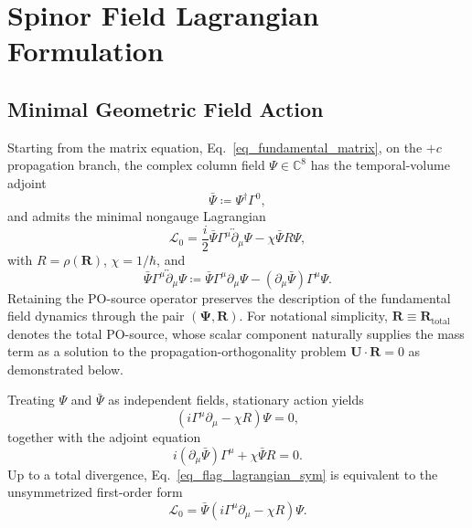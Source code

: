 
\section{Spinor Field Lagrangian Formulation}\label{appx_spinor_lagrangian}
\subsection{Minimal Geometric Field Action}
Starting from the matrix equation, Eq.~\eqref{eq_fundamental_matrix}, on the $+c$ propagation branch, the complex column field $\Psi\in\mathbb{C}^{8}$ has the temporal-volume adjoint
\begin{equation}
    \bar{\Psi} \coloneqq \Psi^{\dagger}\Gamma^{0},
\end{equation}
and admits the minimal nongauge Lagrangian
\begin{equation}\label{eq_flag_lagrangian_sym}
    \mathcal{L}_{0} = \frac{i}{2}\bar{\Psi}\Gamma^{\mu}\overleftrightarrow{\partial}_{\mu}\Psi - \chi\bar{\Psi}R\Psi,
\end{equation}
with $R = \rho(\mathbf{R})$, $\chi = 1/\hbar$, and
\begin{equation}
    \bar{\Psi}\Gamma^{\mu}\overleftrightarrow{\partial}_{\mu}\Psi \coloneqq \bar{\Psi}\Gamma^{\mu}\partial_{\mu}\Psi - (\partial_{\mu}\bar{\Psi})\Gamma^{\mu}\Psi.
\end{equation}
Retaining the PO-source operator preserves the description of the fundamental field dynamics through the pair $(\boldsymbol{\Psi},\mathbf{R})$. For notational simplicity, $\mathbf{R}\equiv\mathbf{R}_{\mathrm{total}}$ denotes the total PO-source, whose scalar component naturally supplies the mass term as a solution to the propagation-orthogonality problem $\mathbf{U}\cdot\mathbf{R}=0$ as demonstrated below.

Treating $\Psi$ and $\bar{\Psi}$ as independent fields, stationary action yields
\begin{equation}\label{eq_flag_euler_lagrange}
    \left(i\Gamma^{\mu}\partial_{\mu} - \chi R\right)\Psi = 0,
\end{equation}
together with the adjoint equation
\begin{equation}\label{eq_flag_adjoint_euler_lagrange}
    i(\partial_{\mu}\bar{\Psi})\Gamma^{\mu} + \chi\bar{\Psi}R = 0.
\end{equation}
Up to a total divergence, Eq.~\eqref{eq_flag_lagrangian_sym} is equivalent to the unsymmetrized first-order form
\begin{equation}
    \mathcal{L}_{0} = \bar{\Psi}(i\Gamma^{\mu}\partial_{\mu} - \chi R)\Psi.
\end{equation}

